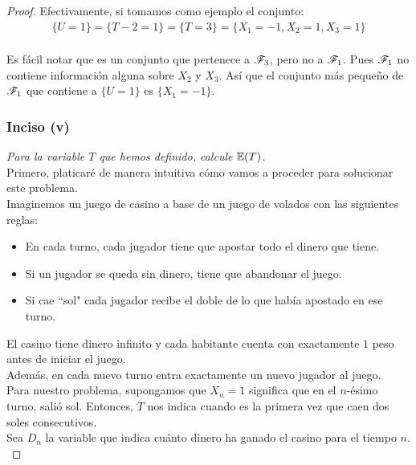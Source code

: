 \begin{proof}
		Efectivamente, si tomamos como ejemplo el conjunto: 
			\begin{align}
				\{ U = 1 \} = \{ T - 2 = 1\} = \{ T = 3\} = \{X_1 = -1, X_2 = 1, X_3 = 1\}
			\end{align}		\\
				
		Es fácil notar que es un conjunto que pertenece a ${\mathscr{F}_3}$, pero no a ${\mathscr{F}_1}$. Pues ${\mathscr{F}_1}$
		no contiene información alguna sobre ${X_2}$ y ${X_3}$. Así que el conjunto más pequeño de ${\mathscr{F}_1}$ 
		que contiene a ${\{ U = 1 \}}$ es ${\{ X_1 = -1 \}}$.\\
	
	\subsubsection{Inciso (v)}	
	\emph
	{
		Para la variable ${T}$ que hemos definido, calcule ${\mathbb{E}\! \left( T \right)}$.\\
	}
		Primero, platicaré de manera intuitiva cómo vamos a proceder para solucionar este problema.\\
	
		Imaginemos un juego de casino a base de un juego de volados con las siguientes reglas:\\
		\begin{itemize}
				\item En cada turno, cada jugador tiene que apostar todo el dinero que tiene.
				\item Si un jugador se queda sin dinero, tiene que abandonar el juego.
				\item Si cae ``sol" cada jugador recibe el doble de lo que había apostado en ese turno.  
		\end{itemize}
	   
		\;El casino tiene dinero infinito y cada habitante cuenta con exactamente ${1}$ peso antes de
		iniciar el juego.\\
	   
		Además, en cada nuevo turno entra exactamente un nuevo jugador al juego.\\
	   
		Para nuestro problema, supongamos que ${X_n = 1}$ significa que en el ${n}$-ésimo turno, salió sol.
		Entonces, ${T}$ nos indica cuando es la primera vez que caen dos soles consecutivos.\\
	   
		Sea ${D_n}$ la variable que indica cuánto dinero ha ganado el casino para el tiempo ${n}$.\\
	   

\end{proof}
